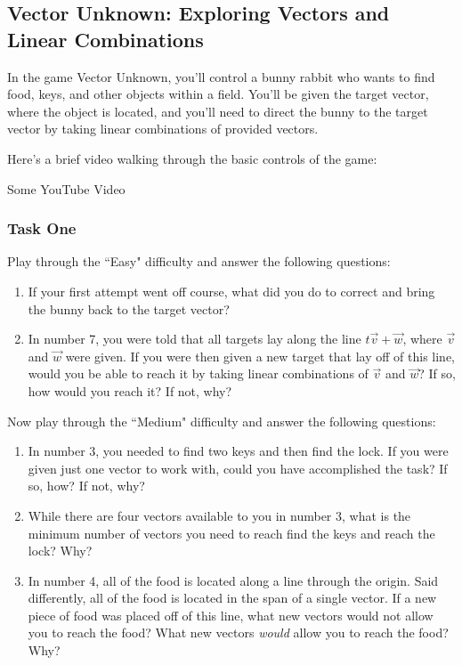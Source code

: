 \documentclass{ximera}
\begin{document}
  \subsection*{Vector Unknown: Exploring Vectors and Linear Combinations}

  In the game Vector Unknown, you'll control a bunny rabbit who wants to find food, keys, and other objects within a field. You'll be given the target vector, where the object is located, and you'll need to direct the bunny to the target vector by taking linear combinations of provided vectors. 

  Here's a brief video walking through the basic controls of the game:

  \begin{center}
    Some YouTube Video
  \end{center}

  \subsubsection{Task One}

  Play through the ``Easy" difficulty and answer the following questions:
  \begin{enumerate}

    \item If your first attempt went off course, what did you do to correct and bring the bunny back to the target vector?
    \item In number 7, you were told that all targets lay along the line $t\vec{v}+\vec{w}$, where $\vec{v}$ and $\vec{w}$ were given. If you were then given a new target that lay off of this line, would you be able to reach it by taking linear combinations of $\vec{v}$ and $\vec{w}$? If so, how would you reach it? If not, why?

  \end{enumerate}

  Now play through the ``Medium" difficulty and answer the following questions:

  \begin{enumerate}

    \item In number 3, you needed to find two keys and then find the lock. If you were given just one vector to work with, could you have accomplished the task? If so, how? If not, why?
    \item While there are four vectors available to you in number 3, what is the minimum number of vectors you need to reach find the keys and reach the lock? Why?
    \item In number 4, all of the food is located along a line through the origin. Said differently, all of the food is located in the span of a single vector. If a new piece of food was placed off of this line, what new vectors would not allow you to reach the food? What new vectors \emph{would} allow you to reach the food? Why?

  \end{enumerate}
\end{document}
